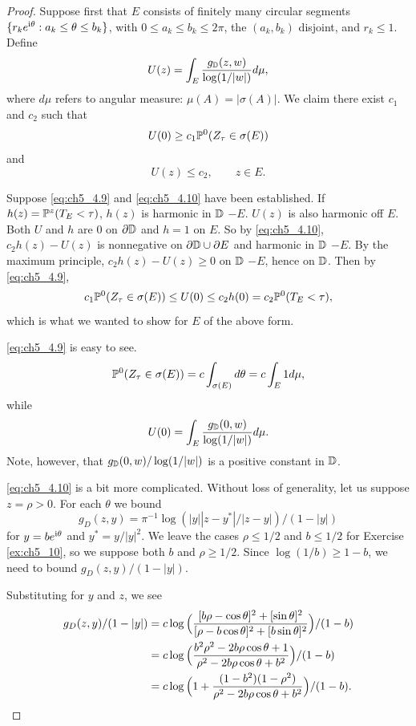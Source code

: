 \begin{proof}
Suppose first that $E$ consists of finitely many circular segments $\{r_ke^{\im\theta} : a_k \leq \theta \leq b_k\}$, with $0 \leq a_k \leq b_k \leq 2\pi$, the $(a_k,b_k)$ disjoint, and $r_k \leq 1$. Define
\begin{equation}\label{eq:ch5_4.8}
    U(z) = \int_E \frac{g_\D(z,w)}{\log(1/|w|)}d\mu,
\end{equation}
where $d\mu$ refers to angular measure: $\mu(A) = |\sigma(A)|$. We claim there exist $c_1$ and $c_2$ such that
\mpagebreak
\begin{equation}\label{eq:ch5_4.9}
    U(0) \geq c_1\P^0(Z_\tau \in \sigma(E))
\end{equation}
and
\begin{equation}\label{eq:ch5_4.10}
    U(z) \leq c_2, \qquad z \in E.
\end{equation}

Suppose \eqref{eq:ch5_4.9} and \eqref{eq:ch5_4.10} have been established. If $h(z) = \P^z(T_E < \tau)$, $h(z)$ is harmonic in $\D$ $- E$. $U(z)$ is also harmonic off $E$. Both $U$ and $h$ are $0$ on $\partial\D$ and $h = 1$ on $E$. So by \eqref{eq:ch5_4.10}, $c_2h(z) - U(z)$ is nonnegative on $\partial\D\cup \partial E$ and harmonic in $\D$ $- E$. By the maximum principle, $c_2h(z) - U(z) \geq 0$ on $\D$ $- E$, hence on $\D$. Then by \eqref{eq:ch5_4.9},
\[
    c_1\P^0(Z_\tau \in \sigma(E)) \leq U(0) \leq c_2h(0) = c_2\P^0(T_E < \tau),
\]
which is what we wanted to show for $E$ of the above form.

\eqref{eq:ch5_4.9} is easy to see.
\[
    \P^0(Z_\tau \in \sigma(E)) = c\int_{\sigma(E)} d\theta = c\int_E 1d\mu,
\]
while
\[
    U(0) = \int_E \frac{g_\D(0,w)}{\log(1/|w|)}d\mu.
\]
Note, however, that $g_\D(0,w)/\log(1/|w|)$ is a positive constant in $\D$.

\eqref{eq:ch5_4.10} is a bit more complicated. Without loss of generality, let us suppose $z = \rho > 0$. For each $\theta$ we bound
\[
    g_D(z,y) = \pi^{-1}\log(|y||z - y^*|/|z - y|)/(1 - |y|)
\]
for $y = be^{\im\theta}$ and $y^* = y/|y|^2$. We leave the cases $\rho \leq 1/2$ and $b \leq 1/2$ for Exercise \ref{ex:ch5_10}, so we suppose both $b$ and $\rho \geq 1/2$. Since $\log(1/b) \geq 1-b$, we need to bound $g_D(z,y)/(1-|y|)$.

Substituting for $y$ and $z$, we see
\begin{align}\label{eq:ch5_4.11}
    g_D(z,y)/(1-|y|) &= c\log\Big(\frac{[b\rho - \cos\theta]^2 + [\sin\theta]^2}{[\rho - b\cos\theta]^2 + [b\sin\theta]^2}\Big)/(1-b) \\
    &= c\log\Big(\frac{b^2\rho^2 - 2b\rho\cos\theta + 1}{\rho^2 - 2b\rho\cos\theta + b^2}\Big)/(1-b) \notag \\
    &= c\log\Big(1 + \frac{(1-b^2)(1-\rho^2)}{\rho^2 - 2b\rho\cos\theta + b^2}\Big)/(1-b). \notag
\end{align}


\end{proof}
